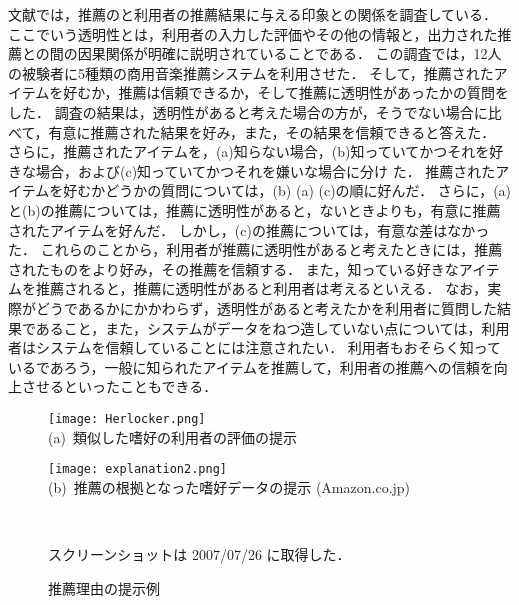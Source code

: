 文献\cite{sigchi:02:01}では，推薦のと利用者の推薦結果に与える印象との関係を調査している．
ここでいう透明性とは，利用者の入力した評価やその他の情報と，出力された推薦との間の因果関係が明確に説明されていることである．
この調査では，12人の被験者に5種類の商用音楽推薦システムを利用させた．
そして，推薦されたアイテムを好むか，推薦は信頼できるか，そして推薦に透明性があったかの質問をした．
調査の結果は，透明性があると考えた場合の方が，そうでない場合に比べて，有意に推薦された結果を好み，また，その結果を信頼できると答えた．
さらに，推薦されたアイテムを，(a)知らない場合，(b)知っていてかつそれを好きな場合，および(c)知っていてかつそれを嫌いな場合に分け
た．
推薦されたアイテムを好むかどうかの質問については，(b) (a) (c)の順に好んだ．
さらに，(a)と(b)の推薦については，推薦に透明性があると，ないときよりも，有意に推薦されたアイテムを好んだ．
しかし，(c)の推薦については，有意な差はなかった．
これらのことから，利用者が推薦に透明性があると考えたときには，推薦されたものをより好み，その推薦を信頼する．
また，知っている好きなアイテムを推薦されると，推薦に透明性があると利用者は考えるといえる．
なお，実際がどうであるかにかかわらず，透明性があると考えたかを利用者に質問した結果であること，また，システムがデータをねつ造していない点については，利用者はシステムを信頼していることには注意されたい．
利用者もおそらく知っているであろう，一般に知られたアイテムを推薦して，利用者の推薦への信頼を向上させるといったこともできる\cite{sigir:01:01}．

\begin{figure}
\centering
\begin{minipage}[b]{0.48\fullwidth}
\centering
\texttt{[image: Herlocker.png]}\\
(a)~類似した嗜好の利用者の評価の提示 \cite{cscw:00:01}
\end{minipage}
\hspace{0.02\fullwidth}
\begin{minipage}[b]{0.48\fullwidth}
\centering
\texttt{[image: explanation2.png]}\\
(b)~推薦の根拠となった嗜好データの提示 (Amazon.co.jp)
\end{minipage}\\
\caption{推薦理由の提示例}
\label{fig:explanation}
{\footnotesize スクリーンショットは 2007/07/26 に取得した．}
\end{figure}


